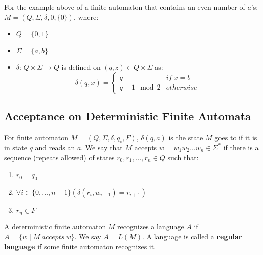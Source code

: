 \documentclass{math}
\begin{document}
For the example above of a finite automaton that contains an even number of
\( a \)'s: \( M = (Q,\Sigma,\delta,0,\{0\}) \), where:
\begin{itemize}
  \item \( Q = \{0,1\} \)
  \item \( \Sigma = \{a,b\} \)
  \item \( \delta \): \( Q\times\Sigma\to Q \) is defined on \( (q,z)\in
    Q\times\Sigma \) as:
    \[ \delta(q,x) = \begin{cases}
      q & if\ x = b \\
      q+1\mod2 & otherwise
    \end{cases} \]
\end{itemize}

\subsection*{Acceptance on Deterministic Finite Automata}
For finite automaton \( M = (Q,\Sigma,\delta,q_{\circ},F) \), \( \delta(q,a) \)
is the state \( M \) goes to if it is in state \( q \) and reads an \( a \).
We say that \( M \) accepts \( w = w_1w_2\dots w_n\in\Sigma^{*} \) if there is
a sequence (repeats allowed) of states \( r_0,r_1,\dots,r_n\in Q \) such that:
\begin{enumerate}
  \item \( r_0 = q_0 \)
  \item \( \forall{i}\in\{0,\dots,n-1\}(\delta(r_i,w_{i+1}) = r_{i+1}) \)
  \item \( r_n \in F \)
\end{enumerate}
A deterministic finite automaton \( M \) recognizes a language \( A \) if
\( A = \{w\mid M\ accepts\ w\} \). We say \( A = L(M) \). A language is called
a \textbf{regular language} if some finite automaton recognizes it.
\end{document}

